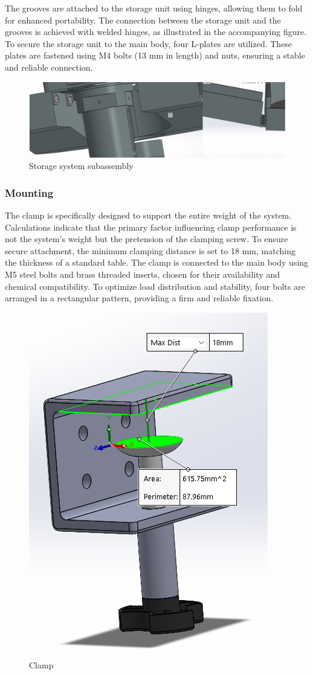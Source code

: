 \documentclass[12pt]{report}
\begin{document}
The grooves are attached to the storage unit using hinges, allowing them to fold for enhanced portability. The connection between the storage unit and the grooves is achieved with welded hinges, as illustrated in the accompanying figure. To secure the storage unit to the main body, four L-plates are utilized. These plates are fastened using M4 bolts (13 mm in length) and nuts, ensuring a stable and reliable connection.

\begin{figure}[h!]
    \centering
    \includegraphics[width=0.5\linewidth]{2.3.6.1.png}
    \caption{Storage system subassembly}
    \label{fig:enter-label}
\end{figure}

\subsubsection{Mounting}

The clamp is specifically designed to support the entire weight of the system. Calculations indicate that the primary factor influencing clamp performance is not the system's weight but the pretension of the clamping screw. To ensure secure attachment, the minimum clamping distance is set to 18 mm, matching the thickness of a standard table.
The clamp is connected to the main body using M5 steel bolts and brass threaded inserts, chosen for their availability and chemical compatibility. To optimize load distribution and stability, four bolts are arranged in a rectangular pattern, providing a firm and reliable fixation.

\begin{figure}[H]
    \centering
    \includegraphics[width=0.3\linewidth]{2.3.7.1.png}
    \caption{Clamp}
    \label{fig:enter-label}
\end{figure}
\end{document}
